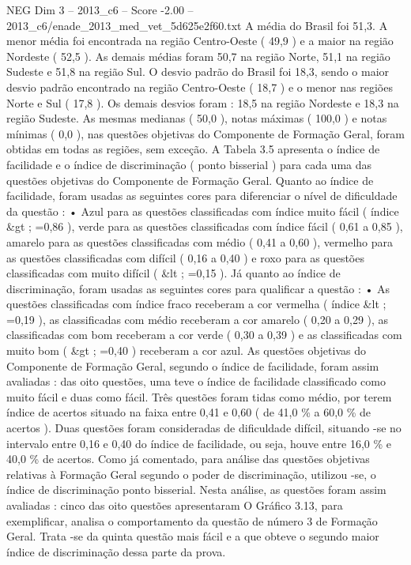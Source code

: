 \begin{textsample}{NEG Dim 3 – 2013\_c6 – Score -2.00 – 2013\_c6/enade\_2013\_med\_vet\_5d625e2f60.txt}
A média do Brasil foi 51,3.
A menor média foi encontrada na região Centro-Oeste ( 49,9 ) e a maior na região Nordeste ( 52,5 ).
As demais médias foram 50,7 na região Norte, 51,1 na região Sudeste e 51,8 na região Sul.
O desvio padrão do Brasil foi 18,3, sendo o maior desvio padrão encontrado na região Centro-Oeste ( 18,7 ) e o menor nas regiões Norte e Sul ( 17,8 ).
Os demais desvios foram : 18,5 na região Nordeste e 18,3 na região Sudeste.
As mesmas medianas ( 50,0 ), notas máximas ( 100,0 ) e notas mínimas ( 0,0 ), nas questões objetivas do Componente de Formação Geral, foram obtidas em todas as regiões, sem exceção.
A Tabela 3.5 apresenta o índice de facilidade e o índice de discriminação ( ponto bisserial ) para cada uma das questões objetivas do Componente de Formação Geral.
Quanto ao índice de facilidade, foram usadas as seguintes cores para diferenciar o nível de dificuldade da questão : • Azul para as questões classificadas com índice muito fácil ( índice \&gt ; =0,86 ), verde para as questões classificadas com índice fácil ( 0,61 a 0,85 ), amarelo para as questões classificadas com médio ( 0,41 a 0,60 ), vermelho para as questões classificadas com difícil ( 0,16 a 0,40 ) e roxo para as questões classificadas com muito difícil ( \&lt ; =0,15 ).
Já quanto ao índice de discriminação, foram usadas as seguintes cores para qualificar a questão : • As questões classificadas com índice fraco receberam a cor vermelha ( índice \&lt ; =0,19 ), as classificadas com médio receberam a cor amarelo ( 0,20 a 0,29 ), as classificadas com bom receberam a cor verde ( 0,30 a 0,39 ) e as classificadas com muito bom ( \&gt ; =0,40 ) receberam a cor azul.
As questões objetivas do Componente de Formação Geral, segundo o índice de facilidade, foram assim avaliadas : das oito questões, uma teve o índice de facilidade classificado como muito fácil e duas como fácil.
Três questões foram tidas como médio, por terem índice de acertos situado na faixa entre 0,41 e 0,60 ( de 41,0 \% a 60,0 \% de acertos ).
Duas questões foram consideradas de dificuldade difícil, situando -se no intervalo entre 0,16 e 0,40 do índice de facilidade, ou seja, houve entre 16,0 \% e 40,0 \% de acertos.
Como já comentado, para análise das questões objetivas relativas à Formação Geral segundo o poder de discriminação, utilizou -se, o índice de discriminação ponto bisserial.
Nesta análise, as questões foram assim avaliadas : cinco das oito questões apresentaram O Gráfico 3.13, para exemplificar, analisa o comportamento da questão de número 3 de Formação Geral.
Trata -se da quinta questão mais fácil e a que obteve o segundo maior índice de discriminação dessa parte da prova.

\end{textsample}
